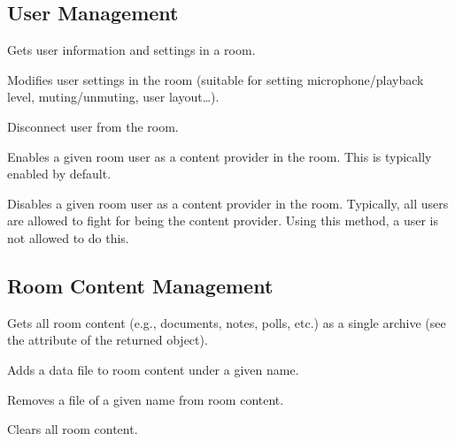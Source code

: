 \subsection{User Management}
\begin{Api}


Gets user information and settings in a room.

Modifies user settings in the room (suitable for setting
microphone/playback level, muting/unmuting, user layout\ldots).

Disconnect user from the room.

Enables a given room user as a content provider in the room. This is typically enabled by default.

Disables a given room user as a content provider in the room. Typically, all users are allowed to fight for being the content provider. Using this method, a user is not allowed to do this.

\end{Api}


\subsection{Room Content Management}
\begin{Api}

Gets all room content (e.g., documents, notes, polls, etc.) as a single archive (see the  attribute of the returned object).

Adds a data file to room content under a given name.

Removes a file of a given name from room content.

Clears all room content.

\end{Api}


